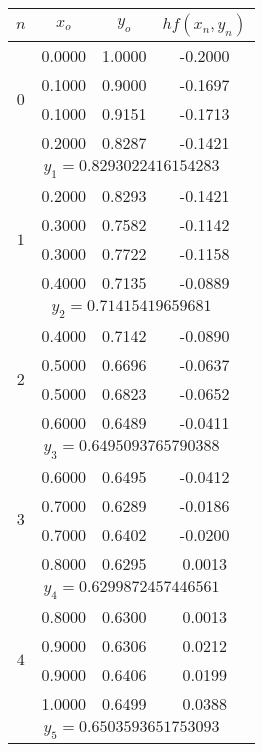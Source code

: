 \begin{longtable}{|c|c|c|c|}\hline
$n$ & $x_o$ &$y_o$ &$hf(x_n,y_n)$ \\ \hline
\endhead

\multirow{4}{*}{$0$}
&0.0000 &1.0000 &-0.2000\\ \cline{2-4}
&0.1000 &0.9000 &-0.1697\\ \cline{2-4}
&0.1000 &0.9151 &-0.1713\\ \cline{2-4}
&0.2000 &0.8287 &-0.1421\\ \hline
\multicolumn{4}{|c|}{$y_1 = 0.8293022416154283$}\\ \hline

&0.2000 &0.8293 &-0.1421\\ \cline{2-4}
\multirow{2}{*}{$1$}
&0.3000 &0.7582 &-0.1142\\ \cline{2-4}
&0.3000 &0.7722 &-0.1158\\ \cline{2-4}
&0.4000 &0.7135 &-0.0889\\ \hline
\multicolumn{4}{|c|}{$y_2 = 0.71415419659681$}\\ \hline

\multirow{4}{*}{$2$}
&0.4000 &0.7142 &-0.0890\\ \cline{2-4}
&0.5000 &0.6696 &-0.0637\\ \cline{2-4}
&0.5000 &0.6823 &-0.0652\\ \cline{2-4}
&0.6000 &0.6489 &-0.0411\\ \hline
\multicolumn{4}{|c|}{$y_3 = 0.6495093765790388$}\\ \hline

\multirow{4}{*}{$3$}
&0.6000 &0.6495 &-0.0412\\ \cline{2-4}
&0.7000 &0.6289 &-0.0186\\ \cline{2-4}
&0.7000 &0.6402 &-0.0200\\ \cline{2-4}
&0.8000 &0.6295 &0.0013\\ \hline
\multicolumn{4}{|c|}{$y_4 = 0.6299872457446561$}\\ \hline

\multirow{4}{*}{$4$}
&0.8000 &0.6300 &0.0013\\ \cline{2-4}
&0.9000 &0.6306 &0.0212\\ \cline{2-4}
&0.9000 &0.6406 &0.0199\\ \cline{2-4}
&1.0000 &0.6499 &0.0388\\ \hline
\multicolumn{4}{|c|}{$y_5 = 0.6503593651753093$}\\ \hline

\end{longtable}

